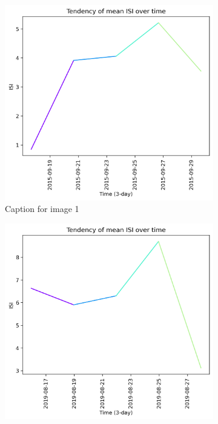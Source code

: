 \begin{figure}[h]
    \centering
    \caption{Caption for the whole figure}
    \begin{subfigure}{0.3\textwidth}
        \centering
        \includegraphics[width=\textwidth]{graphs/2015/15daysprior/2015_15daysprior_tendency_graph_ISI.png}
        \caption{Caption for image 1}
        \label{fig:img1}
    \end{subfigure}
    \hfill
    \begin{subfigure}{0.3\textwidth}
        \centering
        \includegraphics[width=\textwidth]{graphs/2019/15daysprior/2019_15daysprior_tendency_graph_ISI.png}

\end{subfigure}
\end{figure}
